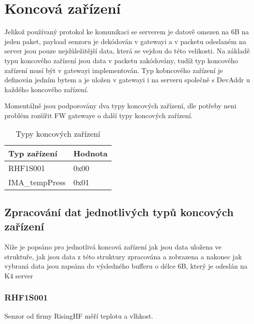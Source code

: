 \section{Koncová zařízení}
Jelikož používaný protokol ke komunikaci se serverem je datově omezen na 6B na jeden paket, payload senzoru je dekódován v gatewayi a v packetu odeslaném na server jsou pouze nejdůležitější data, která se vejdou do této velikosti.
Na základě typu koncového zařízení jsou data v packetu zakódovány, tudíž typ koncového zařízení musí být v gatewayi implementován.
Typ kobncového zařízení je definován jedním bytem a je uložen v gatewayi i na serveru společně s DevAddr u každého koncového zařízení.

Momentálně jsou podporovány dva typy koncových zařízení, dle potřeby neni problém rozšířit FW gatewaye o další typy koncových zařízení.

\begin{table}[!h]
    \centering
    \begin{tabular}{ |l|l| }
     \hline

     Typ zařízení       & Hodnota         \\ \hline \hline
     RHF1S001           & 0x00            \\ \hline
     IMA\_tempPress     & 0x01            \\ \hline
     
    \end{tabular}
    \caption{Typy koncových zařízení}
    \label{table:TypyKoncZarizeni}
\end{table}

\subsection{Zpracování dat jednotlivých typů koncových zařízení}
Níže je popsáno pro jednotlivá koncová zařízení jak jsou data uložena ve struktuře, jak jsou data z této struktury zpracována a zobrazena a nakonec jak vybraná data jsou zapsána do výsledného bufferu o délce 6B, který je odeslán na K4 server

\subsubsection{RHF1S001}
Senzor od firmy RisingHF měří teplotu a vlhkost.

